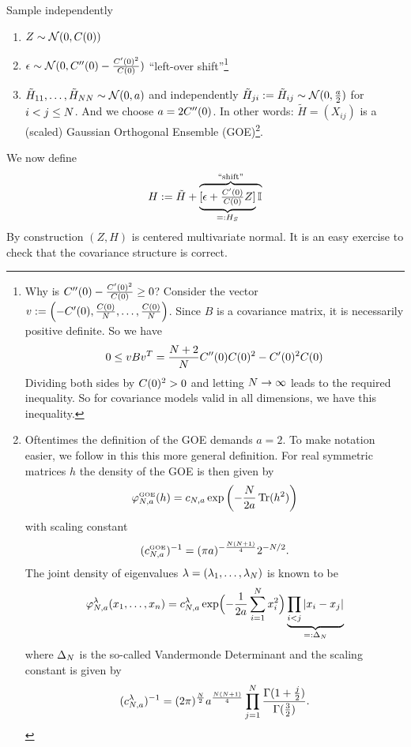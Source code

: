 Sample independently
\begin{enumerate}
	\item \(Z\sim\mathcal{N}(0, C(0))\)
	\item \(\epsilon \sim \mathcal{N}(0, C''(0) - \frac{C'(0)^2}{C(0)})\)
	``left-over shift''\footnote{
		Why is \(C''(0) - \frac{C'(0)^2}{C(0)} \ge 0\)? Consider the
		vector \(v:=\left(-C'(0), \frac{C(0)}{N}, \dots,
		\frac{C(0)}{N}\right)\).  Since \(B\) is a covariance matrix, it
		is necessarily positive definite.
		So we have
		\[
			0 \le v B v^T
			= \frac{N+2}{N}C''(0)C(0)^2 - C'(0)^2C(0)
		\]
		Dividing both sides by \(C(0)^2 > 0\) and letting \(N\to\infty\)
		leads to the required inequality. So for covariance models valid in all
		dimensions, we have this inequality.
	}
	\item \(\tilde{H}_{11},\dots,\tilde{H}_{NN}\sim\mathcal{N}(0,
	a)\) and independently
	\(\tilde{H}_{ji}:=\tilde{H}_{ij}\sim\mathcal{N}(0,\frac{a}{2})\) for
	\(i<j\le N\). And we choose \(a=2C''(0)\).
	In other words: \(\tilde{H} = (X_{ij})\) is a (scaled) Gaussian Orthogonal
	Ensemble (GOE)\footnote{
		Oftentimes the definition of the GOE demands \(a=2\). To make notation
		easier, we follow \textcite{fyodorovHighDimensionalRandomFields2013} in
		this this more general definition.
		For real symmetric matrices \(h\) the density of the GOE is then given by
		\[
			\varphi^{\text{\tiny GOE}}_{N,a}(h)
			= c_{N,a}\exp\left(-\frac{N}{2a}\operatorname{Tr}(h^2)\right)
		\]
		with scaling constant
		\[
			(c^{\text{\tiny GOE}}_{N,a})^{-1}
			= (\pi a)^{-\frac{N(N+1)}{4}}2^{-N/2}.
		\]
		The joint density of eigenvalues
		\(\lambda=(\lambda_1,\dots,\lambda_N)\) is known to be
		\begin{equation}\label{eq: GOE ev density}
			\varphi^{\lambda}_{N, a}(x_1,\dots,x_n)
			= c^\lambda_{N,a}
			\exp\Bigl(-\frac{1}{2a}\sum_{i=1}^N x_i^2\Bigr)
			\underbrace{\prod_{i<j}|x_i - x_j|}_{=:\Delta_N}
		\end{equation}
		where \(\Delta_N\) is the so-called Vandermonde Determinant and
		the scaling constant is given by
		\[
			(c^\lambda_{N,a})^{-1}
			= (2\pi)^{\frac{N}2}a^{\frac{N(N+1)}4}
			\prod_{j=1}^N \frac{\Gamma(1+\frac{j}2)}{\Gamma(\frac32)}.
		\]
	}.
\end{enumerate}
We now define
\[
	H := \tilde{H}
	+ \overbrace{\underbrace{[\epsilon + \tfrac{C'(0)}{C(0)} Z]}_{=:H_S}\mathbb{I}}^{\text{``shift''}}
\]
By construction \((Z,H)\) is centered multivariate normal. It is an easy
exercise to check that the covariance structure is correct.

